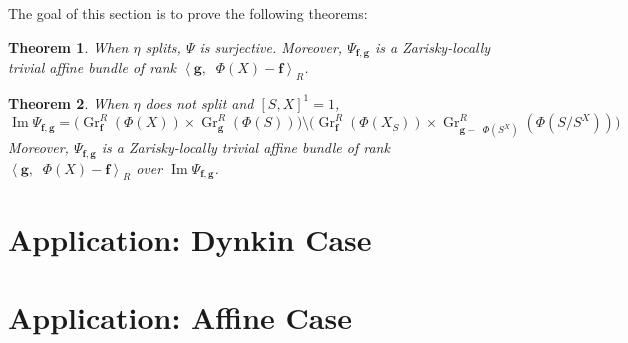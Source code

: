 \documentclass[reqno,11pt]{amsart}
\numberwithin{equation}{section}
\theoremstyle{plain}
\newtheorem{theorem}{Theorem}[section]
\theoremstyle{plain}
\numberwithin{equation}{section}
\theoremstyle{remark}
\DeclareMathOperator{\Img}{\operatorname{Im}}
\DeclareMathOperator{\dimv}{\operatorname{\underline{\mathbf{dim}}}}
\newcommand{\Grr}{\operatorname{Gr}^{R}}
\newcommand{\dimvec}[1]{\mathbf{#1}}
\begin{document}
The goal of this section is to prove the following theorems:
\begin{theorem}
	When $\eta$ splits, $\Psi$ is surjective. Moreover, $\Psi_{\dimvec{f},\dimvec{g}}$ is a Zarisky-locally trivial affine bundle of rank $\left< \dimvec{g},\dimv \Phi(X) - \dimvec{f}\right>_R$.
\end{theorem}
\begin{theorem}
	When $\eta$ does not split and $[S,X]^1=1$, 
	$$\Img \Psi_{\dimvec{f},\dimvec{g}} = \bigg(\Grr_{\dimvec{f}}(\Phi(X)) \times \Grr_{\dimvec{g}}(\Phi(S)) \bigg) \setminus \bigg(\Grr_{\dimvec{f}}(\Phi(X_S)) \times \Grr_{\dimvec{g}-\dimv \Phi(S^X)}\left(\Phi(S/S^X)\right) \bigg)$$
	Moreover, $\Psi_{\dimvec{f},\dimvec{g}}$ is a Zarisky-locally trivial affine bundle of rank $\left< \dimvec{g},\dimv \Phi(X) - \dimvec{f}\right>_R$ over $\Img \Psi_{\dimvec{f},\dimvec{g}}$.
\end{theorem}

\section{Application: Dynkin Case}




\section{Application: Affine Case}





\nocite{irelli2019cell}
\nocite{maksimau2019flag}
\end{document}
